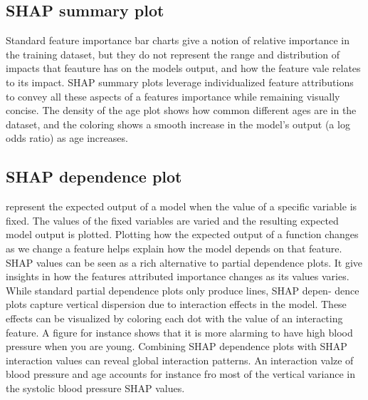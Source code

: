 \documentclass[12pt]{article}
\begin{document}
\subsection{SHAP summary plot}
Standard feature importance bar charts give a notion of relative importance in the training dataset, but they do not represent the range and distribution of impacts that feauture has on the models output, and how the feature vale relates to its impact. SHAP summary plots leverage individualized feature attributions to convey all these aspects of a features importance while remaining visually concise. 
The density of the age plot shows how common different ages are in the dataset, and the coloring shows a smooth increase in the model’s output (a log odds ratio) as age increases.
\subsection{SHAP dependence plot}
represent the expected output of a model when the value of a specific variable is fixed. The values of the fixed variables are varied and the resulting expected model output is plotted. Plotting how the expected output of a function changes as we change a feature helps explain how the model depends on that feature.
SHAP values can be seen as a rich alternative to partial dependence plots. It give insights in how the features attributed importance changes as its values varies. While standard partial dependence plots only produce lines, SHAP depen- dence plots capture vertical dispersion due to interaction effects in the model. These effects can be visualized by coloring each dot with the value of an interacting feature. A figure for instance shows that it is more alarming to have high blood pressure when you are young. Combining SHAP dependence plots with SHAP interaction values can reveal global interaction patterns. An interaction valze of blood pressure and age accounts for instance fro most of the vertical variance in the systolic blood pressure SHAP values. 
\end{document}

